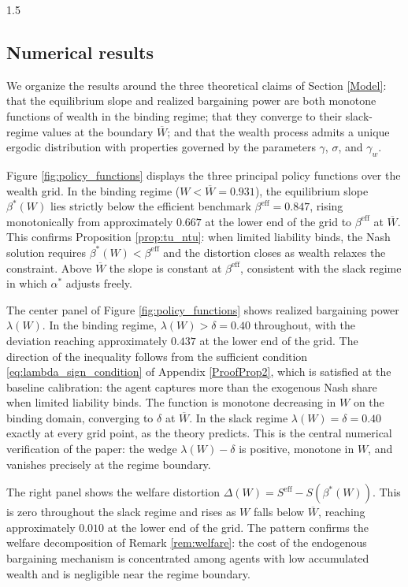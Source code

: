 \documentclass[12pt]{article}
\theoremstyle{definition}
\theoremstyle{plain}
\begin{document}
\begin{spacing}{1.5}
\subsection{Numerical results}\label{subsec:numericalresults}
 
We organize the results around the three theoretical claims of Section \ref{Model}: that the equilibrium slope and realized bargaining power are both monotone functions of wealth in the binding regime; that they converge to their slack-regime values at the boundary $\overline{W}$; and that the wealth process admits a unique ergodic distribution with properties governed by the parameters $\gamma$, $\sigma$, and $\gamma_w$.

 
Figure \ref{fig:policy_functions} displays the three principal policy functions over the wealth grid. In the binding regime ($W < \overline{W} = 0.931$), the equilibrium slope $\beta^*(W)$ lies strictly below the efficient benchmark $\beta^{\mathrm{eff}} = 0.847$, rising monotonically from approximately $0.667$ at the lower end of the grid to $\beta^{\mathrm{eff}}$ at $\overline{W}$. This confirms Proposition \ref{prop:tu_ntu}: when limited liability binds, the Nash solution requires $\beta^*(W) < \beta^{\mathrm{eff}}$ and the distortion closes as wealth relaxes the constraint. Above $\overline{W}$ the slope is constant at $\beta^{\mathrm{eff}}$, consistent with the slack regime in which $\alpha^*$ adjusts freely.
 
The center panel of Figure \ref{fig:policy_functions} shows realized bargaining power $\lambda(W)$. In the binding regime, $\lambda(W) > \delta = 0.40$ throughout, with the deviation reaching approximately $0.437$ at the lower end of the grid. The direction of the inequality follows from the sufficient condition \eqref{eq:lambda_sign_condition} of Appendix \ref{ProofProp2}, which is satisfied at the baseline calibration: the agent captures more than the exogenous Nash share when limited liability binds. The function is monotone decreasing in $W$ on the binding domain, converging to $\delta$ at $\overline{W}$. In the slack regime $\lambda(W) = \delta = 0.40$ exactly at every grid point, as the theory predicts. This is the central numerical verification of the paper: the wedge $\lambda(W) - \delta$ is positive, monotone in $W$, and vanishes precisely at the regime boundary.
 
The right panel shows the welfare distortion $\Delta(W) = S^{\mathrm{eff}} - S(\beta^*(W))$. This is zero throughout the slack regime and rises as $W$ falls below $\overline{W}$, reaching approximately $0.010$ at the lower end of the grid. The pattern confirms the welfare decomposition of Remark \ref{rem:welfare}: the cost of the endogenous bargaining mechanism is concentrated among agents with low accumulated wealth and is negligible near the regime boundary.
 

\end{spacing}
\end{document}
